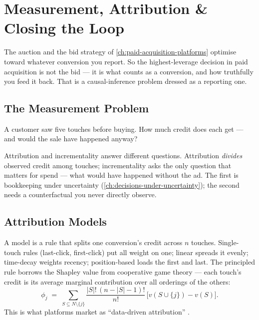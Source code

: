 \chapter{Measurement, Attribution \& Closing the Loop}\label{ch:attribution-and-measurement}


The auction and the bid strategy of \cref{ch:paid-acquisition-platforms} optimise toward whatever conversion you report. So the highest-leverage decision in paid acquisition is not the bid --- it is what counts as a conversion, and how truthfully you feed it back. That is a causal-inference problem dressed as a reporting one.

\section{The Measurement Problem}\label{sec:measurement-problem}

\begin{decision}
A customer saw five touches before buying. How much credit does each get --- and would the sale have happened anyway?
\end{decision}

\begin{intuition}
Attribution and incrementality answer different questions. Attribution \emph{divides} observed credit among touches; incrementality asks the only question that matters for spend --- what would have happened without the ad. The first is bookkeeping under uncertainty (\cref{ch:decisions-under-uncertainty}); the second needs a counterfactual you never directly observe.
\end{intuition}

\section{Attribution Models}\label{sec:attribution-models}

\begin{derivation}
A model is a rule that splits one conversion's credit across $n$ touches. Single-touch rules (last-click, first-click) put all weight on one; linear spreads it evenly; time-decay weights recency; position-based loads the first and last. The principled rule borrows the Shapley value from cooperative game theory --- each touch's credit is its average marginal contribution over all orderings of the others:
\begin{equation}\label{eq:shapley}
  \phi_j \;=\; \sum_{S\subseteq N\setminus\{j\}} \frac{|S|!\,(n-|S|-1)!}{n!}\,\bigl[v(S\cup\{j\})-v(S)\bigr].
\end{equation}
This is what platforms market as ``data-driven attribution'' \parencite{li2014attributing,gads6259715,ga10596866}.
\end{derivation}

